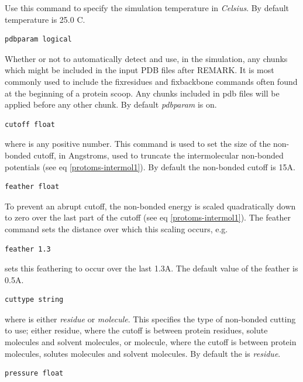 \documentclass[letterpaper,10pt,english]{manual}
\begin{document}
Use this command to specify the simulation temperature in \emph{Celsius}. By default temperature is 25.0 C.
\begin{Verbatim}[commandchars=@\[\]]
pdbparam logical
\end{Verbatim}

Whether or not to automatically detect and use, in the simulation, any chunks which might be included in the input PDB files after REMARK. It is most commonly used to include the fixresidues and fixbackbone commands often found at the beginning of a protein scoop. Any chunks included in pdb files will be applied before any other chunk. By default \emph{pdbparam} is on.
\begin{Verbatim}[commandchars=@\[\]]
cutoff float
\end{Verbatim}

where  is any positive number. This command is used to set the size of the non-bonded cutoff, in Angstroms, used to truncate the intermolecular non-bonded potentials (see eq \eqref{protoms-intermol1}). By default the non-bonded cutoff is 15A.
\begin{Verbatim}[commandchars=@\[\]]
feather float
\end{Verbatim}

To prevent an abrupt cutoff, the non-bonded energy is scaled quadratically down to zero over the last part of the cutoff (see eq \eqref{protoms-intermol1}). The feather command sets the distance over which this scaling occurs, e.g.

\begin{Verbatim}[commandchars=@\[\]]
feather 1.3
\end{Verbatim}

sets this feathering to occur over the last 1.3A. The default value of the feather is 0.5A.
\begin{Verbatim}[commandchars=@\[\]]
cuttype string
\end{Verbatim}

where  is either \emph{residue} or \emph{molecule}. This specifies the type of non-bonded cutting to use; either residue, where the cutoff is between protein residues, solute molecules and solvent molecules, or molecule, where the cutoff is between protein molecules, solutes molecules and solvent molecules. By default the  is \emph{residue}.
\begin{Verbatim}[commandchars=@\[\]]
pressure float
\end{Verbatim}
\end{document}
